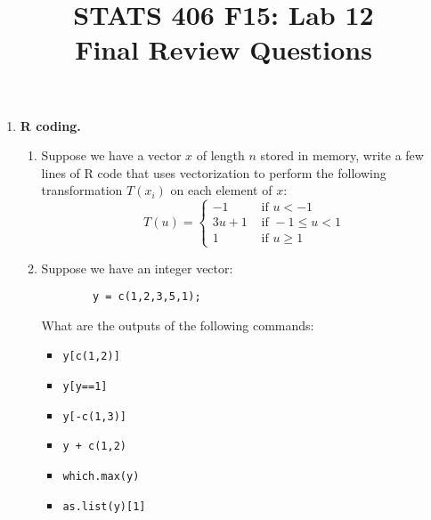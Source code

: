 \documentclass[11pt]{article}
\begin{document}
\title{\Large \bf STATS 406 F15: Lab 12\\Final Review Questions}
\date{}

\maketitle

\begin{enumerate}
	\item {\bf R coding.}
	\begin{enumerate}
		\item Suppose we have a vector $x$ of length $n$ stored in memory, write a few lines of R code that uses vectorization to perform the following transformation $T(x_i)$ on each element of $x$:
		$$
			T(u)=\begin{cases}
				-1 &   \textrm{ if } u<-1\\
				3u+1 & \textrm{ if } -1\leq u <1\\
				1  &   \textrm{ if } u\geq 1
			\end{cases}
		$$
		\item Suppose we have an integer vector:
		\begin{verbatim}
		y = c(1,2,3,5,1);
		\end{verbatim}
		What are the outputs of the following commands:
		\begin{itemize}
			\item \begin{verbatim}y[c(1,2)]	\end{verbatim}
			\item \begin{verbatim}y[y==1]	\end{verbatim}
			\item \begin{verbatim}y[-c(1,3)]	\end{verbatim}
			\item \begin{verbatim}y + c(1,2)	\end{verbatim}
			\item \begin{verbatim}which.max(y)	\end{verbatim}
			\item \begin{verbatim}as.list(y)[1]	\end{verbatim}
		\end{itemize}

\end{enumerate}
\end{enumerate}
\end{document}

